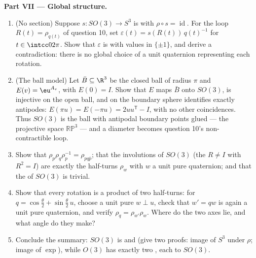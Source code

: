 \begin{problem}
\medskip
\noindent\textbf{Part VII --- Global structure.}
\begin{enumerate}[resume]
  \item (No  section) Suppose $s \colon SO(3) \to
        S^3$ is  with $\rho \circ s =
        \operatorname{id}$. For the loop $R(t) =
        \rho_{q(t)}$ of question 10, set $\varepsilon(t) =
        s(R(t))\,q(t)^{-1}$ for $t \in \intcc0{2\pi}$. Show
        that $\varepsilon$ is  with values in
        $\{\pm1\}$, and derive a contradiction: there is no
         global choice of a unit quaternion
        representing each rotation.
  \item (The ball model) Let $\bar B \subseteq \R^3$ be the
        closed ball of radius $\pi$ and $E(v) = \eu^{A_v}$,
        with $E(0) = I$. Show that $E$ maps $\bar B$ onto
        $SO(3)$, is injective on the open ball, and on the
        boundary sphere identifies exactly antipodes:
        $E(\pi u) = E(-\pi u) = 2uu^{\mathsf T} - I$, with
        no other coincidences. Thus $SO(3)$ is the ball
        with antipodal boundary points glued --- the
        projective space $\mathbb{RP}^3$ --- and a diameter
        becomes question 10's non-contractible loop.
  \item Show that $\rho_p\rho_q\rho_p^{-1} = \rho_{pq\bar
        p}$; that the involutions of $SO(3)$ (the $R \neq
        I$ with $R^2 = I$) are exactly the half-turns
        $\rho_w$ with $w$ a unit pure quaternion; and that
        the  of $SO(3)$ is trivial.
  \item Show that every rotation is a product of two
        half-turns: for $q = \cos\frac\theta2 +
        \sin\frac\theta2\,u$, choose a unit pure $w \perp
        u$, check that $w' = qw$ is again a unit pure
        quaternion, and verify $\rho_q =
        \rho_{w'}\rho_w$. Where do the two axes lie, and
        what angle do they make?
  \item Conclude the  summary: $SO(3)$ is
         and  (give two proofs:
         image of $S^3$ under $\rho$; image of
        $\exp$), while $O(3)$ has exactly two , each  to $SO(3)$.


\end{enumerate}
\end{problem}
